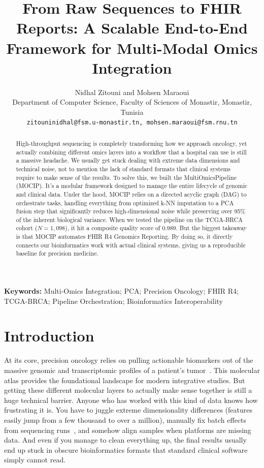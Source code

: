 \documentclass[12pt,a4paper,onecolumn]{article}
\title{From Raw Sequences to FHIR Reports: A Scalable End-to-End Framework for Multi-Modal Omics Integration}
\author{Nidhal Zitouni and Mohsen Maraoui \\
\small Department of Computer Science, Faculty of Sciences of Monastir, Monastir, Tunisia \\
\small \texttt{zitouninidhal@fsm.u-monastir.tn, mohsen.maraoui@fsm.rnu.tn}}
\date{}
\begin{document}
\maketitle


\begin{abstract}
High-throughput sequencing is completely transforming how we approach oncology, yet actually combining different omics layers into a workflow that a hospital can use is still a massive headache. We usually get stuck dealing with extreme data dimensions and technical noise, not to mention the lack of standard formats that clinical systems require to make sense of the results. To solve this, we built the MultiOmicsPipeline (MOCIP). It's a modular framework designed to manage the entire lifecycle of genomic and clinical data. Under the hood, MOCIP relies on a directed acyclic graph (DAG) to orchestrate tasks, handling everything from optimized k-NN imputation to a PCA fusion step that significantly reduces high-dimensional noise while preserving over 95\% of the inherent biological variance. When we tested the pipeline on the TCGA-BRCA cohort ($N=1,098$), it hit a composite quality score of 0.989. But the biggest takeaway is that MOCIP automates FHIR R4 Genomics Reporting. By doing so, it directly connects our bioinformatics work with actual clinical systems, giving us a reproducible baseline for precision medicine.
\end{abstract}

\noindent
\textbf{Keywords:} 
Multi-Omics Integration; PCA; Precision Oncology; FHIR R4; TCGA-BRCA; Pipeline Orchestration; Bioinformatics Interoperability


\section{Introduction}
At its core, precision oncology relies on pulling actionable biomarkers out of the massive genomic and transcriptomic profiles of a patient's tumor~\cite{tomczak2015}. This molecular atlas provides the foundational landscape for modern integrative studies. But getting these different molecular layers to actually make sense together is still a huge technical barrier. Anyone who has worked with this kind of data knows how frustrating it is. You have to juggle extreme dimensionality differences (features easily jump from a few thousand to over a million), manually fix batch effects from sequencing runs~\cite{leek2010}, and somehow align samples when platforms are missing data. And even if you manage to clean everything up, the final results usually end up stuck in obscure bioinformatics formats that standard clinical software simply cannot read.
\end{document}
